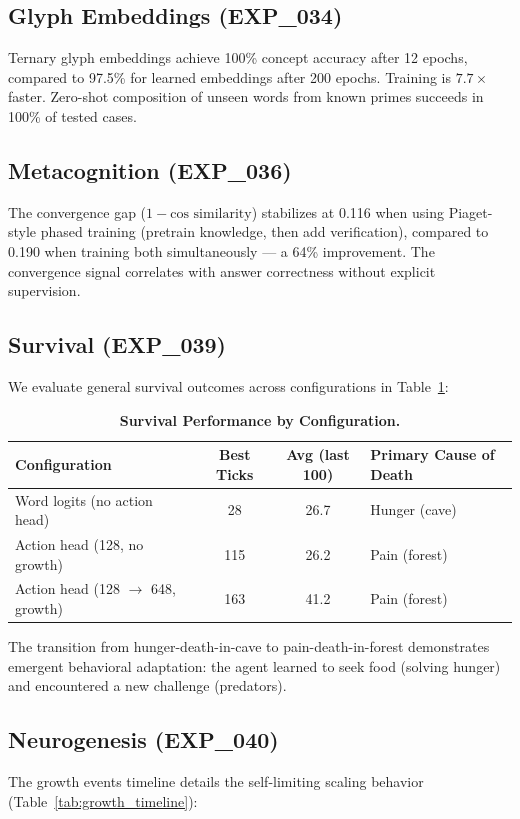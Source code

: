 \documentclass{article}
\begin{document}
\subsection{Glyph Embeddings (EXP\_034)}
Ternary glyph embeddings achieve 100\% concept accuracy after 12 epochs, compared to 97.5\% for learned embeddings after 200 epochs. Training is $7.7\times$ faster. Zero-shot composition of unseen words from known primes succeeds in 100\% of tested cases.

\subsection{Metacognition (EXP\_036)}
The convergence gap ($1 - \text{cos similarity}$) stabilizes at 0.116 when using Piaget-style phased training (pretrain knowledge, then add verification), compared to 0.190 when training both simultaneously --- a 64\% improvement. The convergence signal correlates with answer correctness without explicit supervision.

\subsection{Survival (EXP\_039)}
We evaluate general survival outcomes across configurations in Table~\ref{tab:survival_results}:

\begin{table}[h]
\centering
\caption{\textbf{Survival Performance by Configuration.}}
\label{tab:survival_results}
\begin{tabular}{lccl}
\toprule
\textbf{Configuration} & \textbf{Best Ticks} & \textbf{Avg (last 100)} & \textbf{Primary Cause of Death} \\
\midrule
Word logits (no action head) & 28 & 26.7 & Hunger (cave) \\
Action head (128, no growth) & 115 & 26.2 & Pain (forest) \\
Action head (128 $\rightarrow$ 648, growth) & 163 & 41.2 & Pain (forest) \\
\bottomrule
\end{tabular}
\end{table}

The transition from hunger-death-in-cave to pain-death-in-forest demonstrates emergent behavioral adaptation: the agent learned to seek food (solving hunger) and encountered a new challenge (predators).

\subsection{Neurogenesis (EXP\_040)}
The growth events timeline details the self-limiting scaling behavior (Table~\ref{tab:growth_timeline}):
\end{document}
